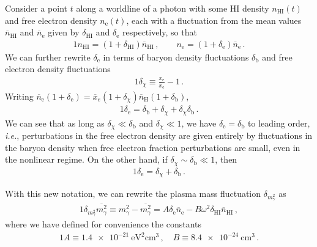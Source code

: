 \documentclass[prd,aps,10pt,nofootinbib,twocolumn,superscriptaddress,preprintnumbers,balancelastpage,longbibliography]{revtex4-1}
\begin{document}
Consider a point $t$ along a worldline of a photon with some HI density $n_\text{HI}(t)$ and free electron density $n_\text{e}(t)$, each with a fluctuation from the mean values $\overline{n}_\text{HI}$ and $\overline{n}_\text{e}$ given by $\delta_\text{HI}$ and $\delta_\text{e}$ respectively, so that 
%
\begin{alignat}{1}
    n_\text{HI} = (1 + \delta_\text{HI}) \overline{n}_\text{HI} \,, \qquad n_\text{e} = (1 + \delta_\text{e}) \overline{n}_\text{e} \,. 
\end{alignat}
%
We can further rewrite $\delta_\text{e}$ in terms of baryon density fluctuations $\delta_\text{b}$ and free electron density fluctuations
%
\begin{alignat}{1}
    \delta_\chi \equiv \frac{x_\text{e}}{\overline{x}_\text{e}} - 1 \,.
\end{alignat}
%
Writing $\overline{n}_\text{e}(1 + \delta_\text{e}) = \overline{x}_e(1 + \delta_\chi) \overline{n}_\text{H}(1 + \delta_\text{b})$,
%
\begin{alignat}{1}
    \delta_\text{e} = \delta_\text{b} + \delta_\chi + \delta_\chi \delta_\text{b} \,.
\end{alignat}
We can see that as long as $\delta_\chi \ll \delta_\text{b}$ and $\delta_\chi \ll 1$, we have $\delta_\text{e} = \delta_\text{b}$ to leading order, \emph{i.e.}, perturbations in the free electron density are given entirely by fluctuations in the baryon density when free electron fraction perturbations are small, even in the nonlinear regime. On the other hand, if $\delta_\chi \sim \delta_\text{b} \ll 1$, then
%
\begin{alignat}{1}
    \delta_\text{e} = \delta_\chi + \delta_\text{b} \,.
    \label{eq:delta_e_linear}
\end{alignat}
%


With this new notation, we can rewrite the plasma mass fluctuation $\delta_{m_\gamma^2}$ as
%
\begin{alignat}{1}
    \delta_{m_\gamma^2} \overline{m_\gamma^2} \equiv m_\gamma^2 - \overline{m_\gamma^2} = A \delta_\text{e} \overline{n}_\text{e} - B \omega^2 \delta_\text{HI} \overline{n}_\text{HI} \,,
    \label{eq:delta_m_gamma_sq}
\end{alignat}
%
where we have defined for convenience the constants
%
\begin{alignat}{1}
    A \equiv \SI{1.4e-21}{\eV\squared\centi\meter\cubed} \,, \quad B \equiv \SI{8.4e-24}{\centi\meter\cubed} \,.
\end{alignat}
%
\end{document}
